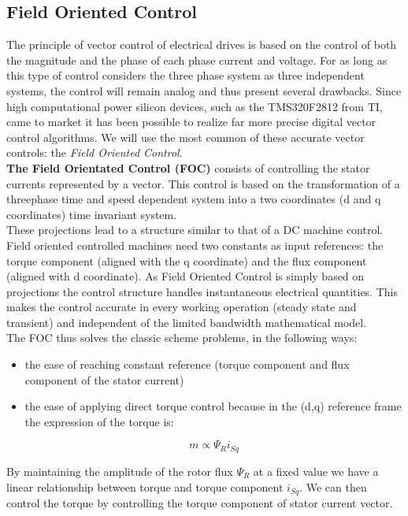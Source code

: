 \documentclass[12pt]{article}
\begin{document}
\subsection{Field Oriented Control}
The principle of vector control of electrical drives is based on the control of both the magnitude and the phase of each phase current and voltage. For as long as this type of control considers the three phase system as three independent systems, the control will remain analog and thus present several drawbacks. Since high computational power silicon devices, such as the TMS320F2812 from TI, came to market it has been possible to realize far more precise digital vector control algorithms. We will use the most common of these accurate vector controls: the \textit{Field Oriented Control}.\\
\textbf{The Field Orientated Control (FOC)} consists of controlling the stator currents represented by a vector. This control is based on the transformation of a threephase
time and speed dependent system into a two coordinates (d and q coordinates) time invariant system.\\ 
These projections lead to a structure similar to that of a DC
machine control. Field oriented controlled machines need two constants as input references: the torque component (aligned with the q coordinate) and the flux component (aligned with d coordinate). As Field Oriented Control is simply based on
projections the control structure handles instantaneous electrical quantities. This makes the control accurate in every working operation (steady state and transient) and independent of the limited bandwidth mathematical model.\\ The FOC thus solves the classic scheme problems, in the following ways:
\begin{itemize}
\item  the ease of reaching constant reference (torque component and flux component of the
stator current)
\item the ease of applying direct torque control because in the (d,q) reference frame the
expression of the torque is:
\begin{center}
$$m\propto\Psi_{R}i_{Sq}$$
\end{center}
\end{itemize}
By maintaining the amplitude of the rotor flux $\Psi_{R}$ at a fixed value we have a linear relationship between torque and torque component $i_{Sq}$. We can then control the torque
by controlling the torque component of stator current vector.\\
\end{document}

